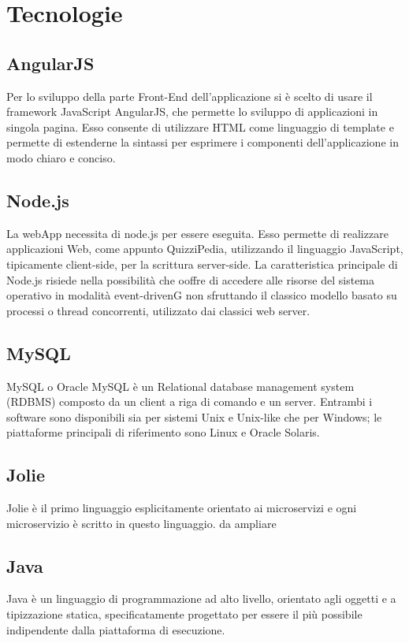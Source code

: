 \newpage
\section{Tecnologie}
\subsection{AngularJS}
Per lo sviluppo della parte Front-End dell'applicazione si è scelto di usare il framework JavaScript AngularJS, che permette lo sviluppo di applicazioni in singola pagina. Esso consente di utilizzare HTML come linguaggio di template e permette di estenderne la sintassi per esprimere i componenti dell'applicazione in modo chiaro e conciso.

\subsection{Node.js}
La webApp necessita di node.js per essere eseguita. Esso permette di realizzare applicazioni Web, come appunto QuizziPedia, utilizzando il linguaggio JavaScript, tipicamente client-side, per la scrittura server-side. La caratteristica principale di Node.js risiede nella possibilità che ooffre di accedere alle risorse del sistema operativo in modalità event-drivenG non sfruttando il classico modello basato su processi o thread concorrenti, utilizzato dai classici web server.

\subsection{MySQL}
MySQL o Oracle MySQL  è un Relational database management system (RDBMS) composto da un client a riga di comando e un server. Entrambi i software sono disponibili sia per sistemi Unix e Unix-like che per Windows; le piattaforme principali di riferimento sono Linux e Oracle Solaris.


\subsection{Jolie}
Jolie è il primo linguaggio esplicitamente orientato ai microservizi e ogni microservizio è scritto in questo linguaggio.
da ampliare

\subsection{Java}
 Java è un linguaggio di programmazione ad alto livello, orientato agli oggetti e a tipizzazione statica, specificatamente progettato per essere il più possibile indipendente dalla piattaforma di esecuzione.
 
